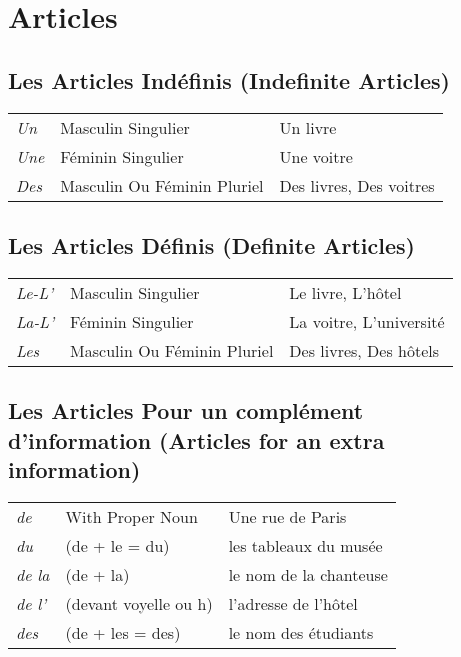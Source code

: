 \section{Articles}

\subsection{Les Articles Ind\'efinis (Indefinite Articles)}

\begin{tabular} {l l l}
\emph{Un}	& Masculin Singulier		& Un livre			\\
\emph{Une}	& F\'eminin Singulier		& Une voitre			\\
\emph{Des}	& Masculin Ou F\'eminin Pluriel	& Des livres, Des voitres	\\
\end{tabular}

\subsection{Les Articles D\'efinis (Definite Articles)}
\begin{tabular} {l l l}
\emph{Le-L'}	& Masculin Singulier		& Le livre, L'h\^otel		\\
\emph{La-L'}	& F\'eminin Singulier		& La voitre, L'universit\'e	\\
\emph{Les}	& Masculin Ou F\'eminin Pluriel	& Des livres, Des h\^otels	\\
\end{tabular}

\subsection{Les Articles Pour un compl\'ement d'information (Articles for an extra information)}
\begin{tabular} {l l l}
\emph{de} 	& With Proper Noun	& Une rue de Paris		\\
\emph{du}  	& (de + le = du)	& les tableaux du mus\'ee	\\
\emph{de la}  	& (de + la)		& le nom de la chanteuse	\\
\emph{de l'}  	& (devant voyelle ou h)	& l'adresse de l'h\^otel	\\
\emph{des}  	& (de + les = des)	& le nom des \'etudiants	\\
\end{tabular}

